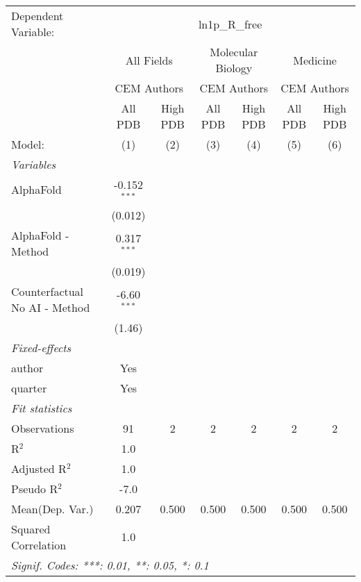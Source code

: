 \begingroup
\centering
\begin{tabular}{lcccccc}
   \tabularnewline \midrule \midrule
   Dependent Variable: & \multicolumn{6}{c}{ln1p\_R\_free}\\
 & \multicolumn{2}{c}{All Fields} & \multicolumn{2}{c}{Molecular Biology} & \multicolumn{2}{c}{Medicine} \\
\cmidrule(lr){2-3} \cmidrule(lr){4-5} \cmidrule(lr){6-7}
 & \multicolumn{2}{c}{CEM Authors} & \multicolumn{2}{c}{CEM Authors} & \multicolumn{2}{c}{CEM Authors} \\
\cmidrule(lr){2-3} \cmidrule(lr){4-5} \cmidrule(lr){6-7}
 & \multicolumn{1}{c}{All PDB} & \multicolumn{1}{c}{High PDB} & \multicolumn{1}{c}{All PDB} & \multicolumn{1}{c}{High PDB} & \multicolumn{1}{c}{All PDB} & \multicolumn{1}{c}{High PDB} \\
\cmidrule(lr){2-2} \cmidrule(lr){3-3} \cmidrule(lr){4-4} \cmidrule(lr){5-5} \cmidrule(lr){6-6} \cmidrule(lr){7-7}
   Model:                        & (1)            & (2) & (3) & (4) & (5) & (6)\\  
   \midrule
   \emph{Variables}\\
   AlphaFold                     & -0.152$^{***}$ &     &     &     &     &   \\   
                                 & (0.012)        &     &     &     &     &   \\   
   AlphaFold - Method            & 0.317$^{***}$  &     &     &     &     &   \\   
                                 & (0.019)        &     &     &     &     &   \\   
   Counterfactual No AI - Method & -6.60$^{***}$  &     &     &     &     &   \\   
                                 & (1.46)         &     &     &     &     &   \\   
   \midrule
   \emph{Fixed-effects}\\
   author                        & Yes            &     &     &     &     & \\  
   quarter                       & Yes            &     &     &     &     & \\  
   \midrule
   \emph{Fit statistics}\\
   Observations                  & 91             & 2   & 2   & 2   & 2   & 2\\  
   R$^2$                         & 1.0            &     &     &     &     & \\  
   Adjusted R$^2$                & 1.0            &     &     &     &     & \\  
   Pseudo R$^2$                  & -7.0           &     &     &     &     & \\  
Mean(Dep. Var.) & 0.207 & 0.500 & 0.500 & 0.500 & 0.500 & 0.500 \\
   Squared Correlation           & 1.0            &     &     &     &     & \\  
   \midrule \midrule
   \multicolumn{7}{l}{\emph{Signif. Codes: ***: 0.01, **: 0.05, *: 0.1}}\\
\end{tabular}
\par\endgroup
